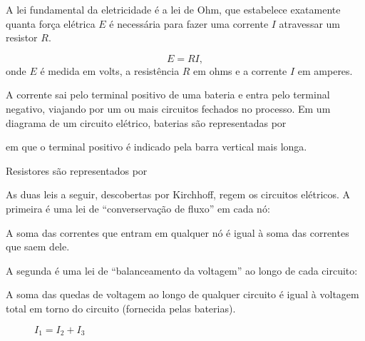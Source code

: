 A lei fundamental da eletricidade é a \textrm{lei de Ohm}, que estabelece exatamente quanta força elétrica $E$ é necessária para fazer uma corrente $I$ atravessar um resistor $R$.

\begin{definicao}
    \[
        E = RI,
    \] 
    onde $E$ é medida em \textrm{volts}, a resistência $R$ em \textrm{ohms} e a corrente $I$ em \textrm{amperes}.
\end{definicao}

A corrente sai pelo terminal positivo de uma bateria e entra pelo terminal negativo, viajando por um ou mais circuitos fechados no processo. Em um diagrama de um circuito elétrico, baterias são representadas por
\begin{center}
\end{center}
em que o terminal positivo é indicado pela barra vertical mais longa.

Resistores são representados por
\begin{center}
\end{center}

As duas leis a seguir, descobertas por Kirchhoff, regem os circuitos elétricos. A primeira é uma lei de ``converservação de fluxo'' em cada nó:

\begin{definicao}
    A soma das correntes que entram em qualquer nó é igual à soma das correntes que saem dele.
\end{definicao}

A segunda é uma lei de ``balanceamento da voltagem'' ao longo de cada circuito:

\begin{definicao}
    A soma das quedas de voltagem ao longo de qualquer circuito  é igual à voltagem total em torno do circuito (fornecida pelas baterias).
\end{definicao}

\begin{figure}[!h]
    \centering
    
    \caption{$I_1 = I_2 + I_3$}
\end{figure}

